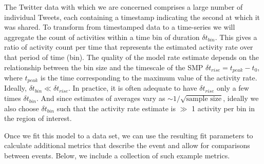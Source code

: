 \documentclass{article}
\begin{document}
The Twitter data with which we are concerned comprises a large number of individual Tweets, each containing a timestamp indicating the second at which it was shared. To transform from timestamped data to a time-series we will aggregate the count of activities within a time bin of duration $\delta t_{bin}$. This gives a ratio of activity count per time that represents the estimated activity rate over that period of time (bin). The quality of the model rate estimate depends on the relationship between the bin size and the timescale of the SMP $\delta t_{rise} = t_{peak} - t_0$, where $t_{peak}$ is the time corresponding to the maximum value of the activity rate. Ideally, $\delta t_{bin} \ll \delta t_{rise}$. In practice, it is often adequate to have $\delta t_{rise}$ only a few times $\delta t_{bin}$. And since estimates of averages vary as $\sim 1/\sqrt{ \text{sample size} }$, ideally we also choose $\delta t_{bin}$ such that the activity rate estimate is $\gg$ 1 activity per bin in the region of interest. 

Once we fit this model to a data set, we can use the resulting fit parameters to calculate additional metrics that describe the event and allow for comparisons between events. Below, we include a collection of such example metrics. 
\end{document}
